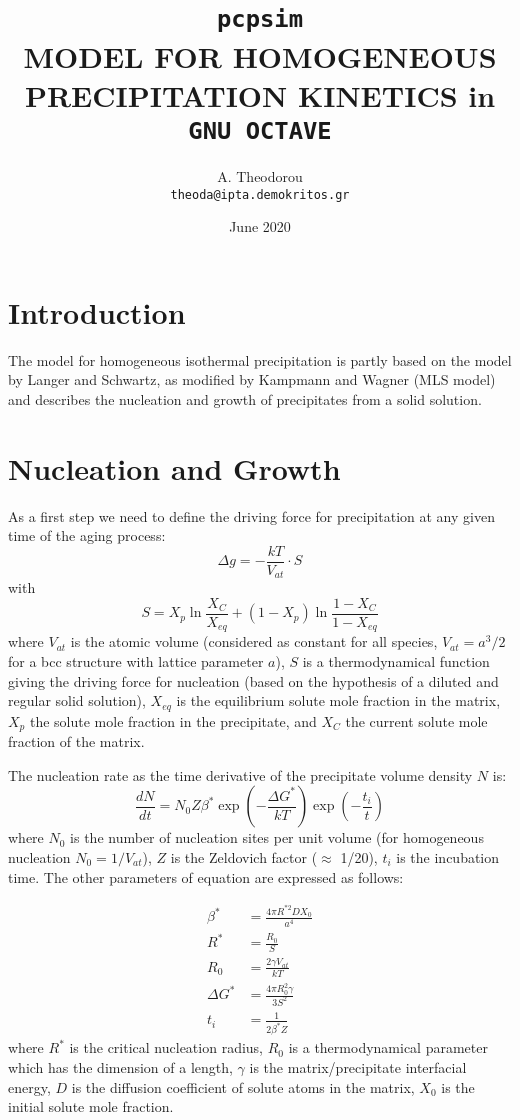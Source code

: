 \documentclass[12pt,a4paper]{article}
\author{
  A. Theodorou\\
  \texttt{theoda@ipta.demokritos.gr}
}
\date{June 2020}
\title{\texttt{pcpsim} \\ 
MODEL FOR HOMOGENEOUS PRECIPITATION KINETICS in \texttt{GNU OCTAVE}
}
\begin{document}
\maketitle

\section{Introduction}
The model for homogeneous isothermal precipitation is partly based on the model by Langer and Schwartz, as modified by Kampmann and Wagner (MLS model) and describes the nucleation and growth of  precipitates from a solid solution.


\section{Nucleation and Growth}

As a first step we need to define the driving force for precipitation at any given time of the aging process: 
\begin{equation}
\Delta g = - \frac{kT}{V_{at}} \cdot S 
\end{equation}
with
\begin{equation}
S =  X_p \ln\frac{X_C}{X_{eq}} + (1 - X_p) \ln\frac{1 - X_C}{1-X_{eq}} 
\end{equation}
where $V_{at}$ is the atomic volume (considered as constant for all species, $V_{at}=a^3/2$ for a bcc structure with lattice parameter $a$), $S$ is a thermodynamical function giving the driving force for nucleation (based
on the hypothesis of a diluted and regular solid solution), $X_{eq}$ is the equilibrium solute mole fraction in the matrix, $X_p$ the solute mole fraction in the precipitate, and $X_C$ the current solute mole fraction of the matrix.

The nucleation rate as the time derivative of the precipitate volume density $N$ is:
\begin{equation}
\label{P_density}
\frac{d N}{d t} = N_0 Z \beta^* \exp(-\frac{\Delta G^*}{kT}) \exp(-\frac{t_i}{t})
\end{equation}
where $N_0$ is the number of nucleation sites per unit volume (for homogeneous nucleation $N_0 = 1/ V_{at}$), $Z$ is the Zeldovich factor ($\approx$ 1/20), $t_i$ is the incubation time. The other parameters of equation are expressed as follows:

\begin{subequations}
	\begin{align}
\beta^* &= \frac{4\pi R^{*2} D X_{0}}{a^4} \\
R^* &= \frac{R_0}{S} \\
R_0 &= \frac{2\gamma V_{at}}{kT} \\
\Delta G^* &= \frac{4\pi R_0^2 \gamma}{3 S^2} \\
t_i &= \frac{1}{2\beta^* Z} 
	\end{align}	
\end{subequations}
where $R^*$ is the critical nucleation radius, $R_0$ is a thermodynamical parameter
which has the dimension of a length, $\gamma$ is the matrix/precipitate interfacial energy, $D$ is the diffusion coefficient of solute atoms in the matrix, $X_{0}$ is the initial solute mole fraction.
\end{document}
